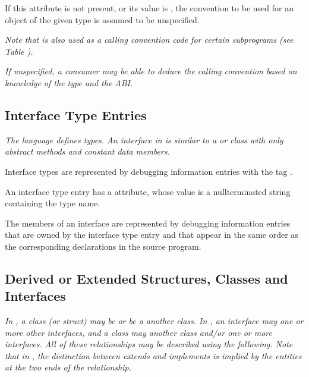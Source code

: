 {If this attribute is not present, or its value is
\DWCCnormalNAME, the convention to be used for an object of the
given type is assumed to be unspecified.

\textit{Note that \DWCCnormalNAME{} is also used as a calling convention 
code for certain subprograms 
(see Table ).}

\textit{If unspecified, a consumer may be able to deduce the calling
convention based on knowledge of the type and the ABI.}


\subsection{Interface Type Entries}
\label{chap:interfacetypeentries}

\textit{The  language defines  types. 
An interface
in  is similar to a  or 
 class with only abstract
methods and constant data members.}

Interface types 
are represented by debugging information
entries with the 
tag \DWTAGinterfacetypeTARG.

An interface type entry has 
a \DWATname{} attribute,
whose value is a null\dash terminated string containing the 
type name.

The members of an interface are represented by debugging
information entries that are owned by the interface type
entry and that appear in the same order as the corresponding
declarations in the source program.

\subsection{Derived or Extended Structures, Classes and Interfaces}
\label{chap:derivedorextendedstructsclasesandinterfaces}

\textit{In , a class (or struct) 
may 
be  or be a
 another class. 
In , an interface may 
one 
or more other interfaces, and a class may  another
class and/or  one or more interfaces. All of these
relationships may be described using the following. Note that
in , 
the distinction between extends and implements is
implied by the entities at the two ends of the relationship.}

}
